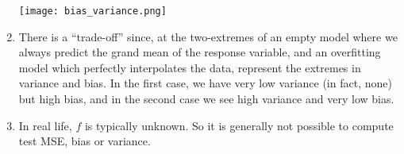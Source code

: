 \documentclass[10pt]{article}
\begin{document}
\begin{enumerate}
	\texttt{[image: bias\_variance.png]}
	
\item There is a ``trade-off'' since, at the two-extremes of an empty model where we always predict the grand mean of the response variable, and an overfitting model which perfectly interpolates the data, represent the extremes in variance and bias.  In the first case, we have very low variance (in fact, none) but high bias, and in the second case we see high variance and very low bias.

\item In real life, $f$ is typically unknown.  So it is generally not possible to compute test MSE, bias or variance.
\end{enumerate}

\vspace{.2in} 
\end{document}
